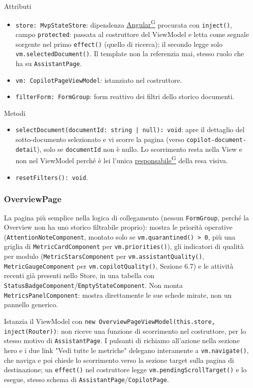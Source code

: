 \documentclass[a4paper,12pt]{article}
\providecommand{\glslink}[2]{\href{https://alittlebyte-19.github.io/Documentazione/glossario.html\#gls-#1}{\underline{#2}\textsuperscript{\scriptsize G}}}
\begin{document}
\begin{sloppypar}
Attributi
\begin{itemize}\raggedright
    \item \texttt{store: MvpStateStore}: dipendenza \glslink{angular}{Angular} procurata con \texttt{inject()}, campo \texttt{protected}: passata al costruttore del ViewModel e letta come segnale sorgente nel primo \texttt{effect()} (quello di ricerca); il secondo legge solo \texttt{vm.selectedDocument()}. Il template non la referenzia mai, stesso ruolo che ha su \texttt{AssistantPage}.
    \item \texttt{vm: CopilotPageViewModel}: istanziato nel costruttore.
    \item \texttt{filterForm: FormGroup}: form reattivo dei filtri dello storico documenti.
\end{itemize}

Metodi
\begin{itemize}\raggedright
    \item \texttt{selectDocument(documentId: string | null): void}: apre il dettaglio del sotto-documento selezionato e vi scorre la pagina (verso \texttt{copilot-document-detail}), solo se \texttt{documentId} non è nullo. Lo scorrimento resta nella View e non nel ViewModel perché è lei l'unica \glslink{responsabile}{responsabile} della resa visiva.
    \item \texttt{resetFilters(): void}.
\end{itemize}

\subsubsection{OverviewPage}

La pagina più semplice nella logica di collegamento (nessun \texttt{FormGroup}, perché la Overview non ha uno storico filtrabile proprio): mostra le priorità operative (\texttt{AttentionNoteComponent}, montato solo se \texttt{vm.quarantined() > 0}, più una griglia di \texttt{MetricCardComponent} per \texttt{vm.priorities()}), gli indicatori di qualità per modulo (\texttt{MetricStarsComponent} per \texttt{vm.assistantQuality()}, \texttt{MetricGaugeComponent} per \texttt{vm.copilotQuality()}, Sezione 6.7) e le attività recenti già presenti nello Store, in una tabella con \texttt{StatusBadgeComponent}/\texttt{EmptyStateComponent}. Non monta \texttt{MetricsPanelComponent}: mostra direttamente le sue schede mirate, non un pannello generico.

Istanzia il ViewModel con \texttt{new OverviewPageViewModel(this.store, inject(Router))}: non riceve una funzione di scorrimento nel costruttore, per lo stesso motivo di \texttt{AssistantPage}. I pulsanti di richiamo all'azione nella sezione hero e i due link "Vedi tutte le metriche" delegano interamente a \texttt{vm.navigate()}, che naviga e poi chiede lo scorrimento verso la sezione target sulla pagina di destinazione; un \texttt{effect()} nel costruttore legge \texttt{vm.pendingScrollTarget()} e lo esegue, stesso schema di \texttt{AssistantPage}/\texttt{CopilotPage}.


\end{sloppypar}
\end{document}
